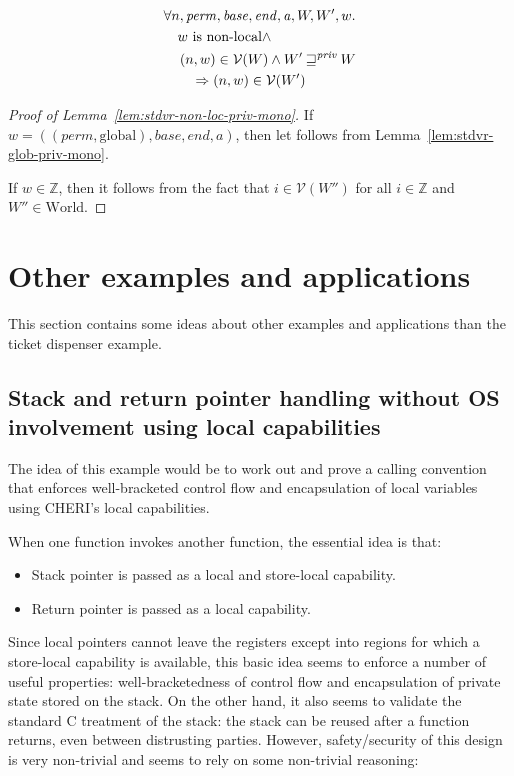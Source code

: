 \documentclass[a4paper]{article}
\newcommand{\var}[1]{\mathit{#1}}
\newcommand{\gl}{\var{g}}
\newcommand{\addr}{\var{a}}
\newcommand{\start}{\var{base}}
\newcommand{\addrend}{\var{end}}
\newcommand{\perm}{\var{perm}}
\newcommand{\stdcap}[1][(\perm,\gl)]{\left(#1,\start,\addrend,\addr \right)}
\newcommand{\futurestr}{\mathbin{\sqsupseteq}^{\var{priv}}}
\newcommand{\asmType}{\plaindom{AsmType}}
\newcommand{\plaindom}[1]{\mathrm{#1}}
\newcommand{\ints}{\mathbb{Z}}
\newcommand{\Worlds}{\plaindom{World}}
\newcommand{\intr}[2]{\mathcal{#1}}
\newcommand{\valueintr}[1]{\intr{V}{#1}}
\newcommand{\stdvr}{\valueintr{\asmType}}
\newcommand{\npair}[2][n]{\left(#1,#2 \right)}
\newcommand{\plainperm}[1]{\mathrm{#1}}
\newcommand{\glob}{\plainperm{global}}
\newcommand{\nonlocal}[1]{\ensuremath{#1} \text{ is non-local}}
\begin{document}
\begin{lemma}[Non local words monotone wrt $\futurestr$]
  \label{lem:stdvr-non-loc-priv-mono}
  \begin{align*}
    & \forall n, \perm, \start, \addrend, \addr, W, W',w \ldotp \\
    & \quad \nonlocal{w} \land \\
    & \quad \npair{w} \in \stdvr(W) \land W' \futurestr W \\
    & \qquad \Rightarrow \npair{w} \in \stdvr(W') 
  \end{align*}
\end{lemma}
\begin{proof}[Proof of Lemma~\ref{lem:stdvr-non-loc-priv-mono}]
  If $w = \stdcap[(\perm,\glob)]$, then let follows from Lemma~\ref{lem:stdvr-glob-priv-mono}.

  If $w \in \ints$, then it follows from the fact that $i \in \stdvr(W'')$ for all $i \in \ints$ and $W'' \in \Worlds$.
\end{proof}

\section{Other examples and applications}
\label{sec:other_apps}
This section contains some ideas about other examples and applications than the
ticket dispenser example.

\subsection{Stack and return pointer handling without OS involvement using local
  capabilities}
The idea of this example would be to work out and prove a calling convention
that enforces well-bracketed control flow and encapsulation of local variables
using CHERI's local capabilities.

When one function invokes another function, the essential idea is that:
\begin{itemize}
\item Stack pointer is passed as a local and store-local capability.
\item Return pointer is passed as a local capability.
\end{itemize}

Since local pointers cannot leave the registers except into regions for which a
store-local capability is available, this basic idea seems to enforce a number
of useful properties: well-bracketedness of control flow and encapsulation of
private state stored on the stack. On the other hand, it also seems to validate
the standard C treatment of the stack: the stack can be reused after a function
returns, even between distrusting parties. However, safety/security of this
design is very non-trivial and seems to rely on some non-trivial reasoning:
\end{document}
